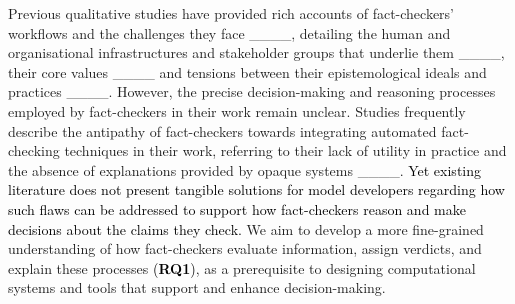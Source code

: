 Previous qualitative studies have provided rich accounts of fact-checkers' workflows and the challenges they face ____, detailing the human and organisational infrastructures and stakeholder groups that underlie them ____, their core values ____ and tensions between their epistemological ideals and practices ____. However, the precise decision-making and reasoning processes employed by fact-checkers in their work remain unclear.
Studies frequently describe the antipathy of fact-checkers towards integrating automated fact-checking techniques in their work, referring to their lack of utility in practice and the absence of explanations provided by opaque systems ____.
\textcolor{black}{Yet existing literature does not present tangible solutions for model developers regarding how such flaws can be addressed to support how fact-checkers reason and make decisions about the claims they check.}
We aim to develop a more fine-grained understanding of how fact-checkers evaluate information, assign verdicts, and explain these processes \textcolor{black}{(\textbf{RQ1})}, as a prerequisite to designing computational systems and tools that support and enhance decision-making.

